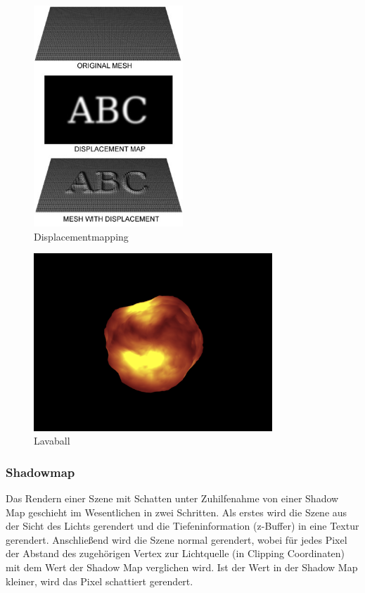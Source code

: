 \begin{figure}[H]
    \centering
    \includegraphics[width=0.5\textwidth]{images/Displacement.jpg}
    \caption{Displacementmapping} %
    \label{fig:displacement-mapping}
\end{figure}

\begin{figure}[H]
    \centering
    \includegraphics[width=0.8\textwidth]{images/lava.png}
    \caption{Lavaball}
    \label{fig:reflection-phong-specular-model}
\end{figure}

\subsubsection{Shadowmap}
Das Rendern einer Szene mit Schatten unter Zuhilfenahme von einer Shadow Map geschieht im Wesentlichen in zwei Schritten. Als erstes wird die Szene aus der Sicht des Lichts gerendert und die Tiefeninformation (z-Buffer) in eine Textur gerendert. Anschließend wird die Szene normal gerendert, wobei für jedes Pixel  der Abstand des zugehörigen Vertex zur Lichtquelle (in Clipping Coordinaten) mit dem Wert der Shadow Map verglichen wird. Ist der Wert in der Shadow Map kleiner, wird  das Pixel schattiert gerendert.

